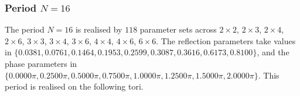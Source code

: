 \par
\subsubsection{Period $N = 16$}
The period $N=16$ is realised by $118$ parameter sets across $2\times2$, $2\times3$, $2\times4$, $2\times6$, $3\times3$, $3\times4$, $3\times6$, $4\times4$, $4\times6$, $6\times6$. The reflection parameters take values in $\{0.0381, 0.0761, 0.1464, 0.1953, 0.2599, 0.3087, 0.3616, 0.6173, 0.8100\}$, and the phase parameters in $\{0.0000\pi, 0.2500\pi, 0.5000\pi, 0.7500\pi, 1.0000\pi, 1.2500\pi, 1.5000\pi, 2.0000\pi\}$. This period is realised on the following tori.
